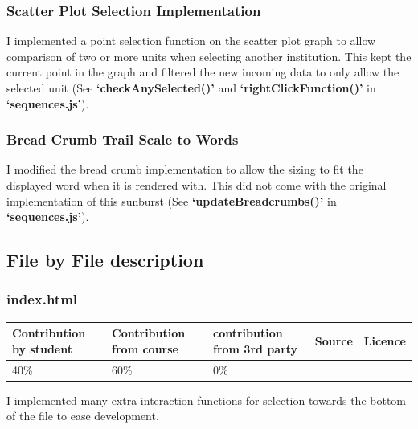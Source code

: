 \documentclass[a4paper, 11pt]{article}
\begin{document}
\subsubsection{Scatter Plot Selection Implementation}
I implemented a point selection function on the scatter plot graph to allow comparison of two or more units when selecting another institution. This kept the current point in the graph and filtered the new incoming data to only allow the selected unit (See \textbf{`checkAnySelected()'} and \textbf{`rightClickFunction()'} in \textbf{`sequences.js'}).

\subsubsection{Bread Crumb Trail Scale to Words}
I modified the bread crumb implementation to allow the sizing to fit the displayed word when it is rendered with. This did not come with the original implementation of this sunburst (See \textbf{`updateBreadcrumbs()'} in \textbf{`sequences.js'}).

\subsection{File by File description}


\subsubsection{index.html}
\begin{center}
 \begin{tabular}{||p{}|p{}|p{}|p{}|p{}||} 
 \hline
 Contribution by student & Contribution from course & contribution from 3rd party & Source & Licence 
 \\
 \hline
 40\% & 60\% & 0\% &  &
 \\
 \hline
\end{tabular}
\end{center}
I implemented many extra interaction functions for selection towards the bottom of the file to ease development.
\end{document}

